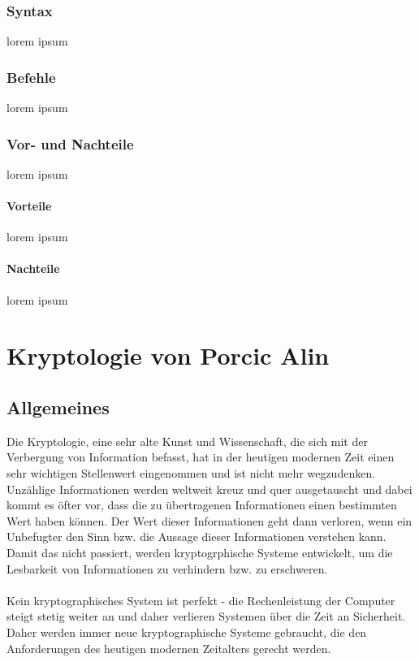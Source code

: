 \documentclass[12pt,a4paper]{report}
\begin{document}
\subsection{Syntax}
lorem ipsum 
\subsection{Befehle}
lorem ipsum
\subsection{Vor- und Nachteile}
lorem ipsum
\subsubsection{Vorteile}
lorem ipsum
\subsubsection{Nachteile}
lorem ipsum

\chapter{Kryptologie von Porcic Alin}
\section{Allgemeines}

Die Kryptologie, eine sehr alte Kunst und Wissenschaft, die sich mit der Verbergung von Information befasst, hat in der heutigen modernen Zeit einen sehr wichtigen Stellenwert eingenommen und ist nicht mehr wegzudenken. Unzählige Informationen werden weltweit kreuz und quer ausgetauscht und dabei kommt es öfter vor, dass die zu übertragenen Informationen einen bestimmten Wert haben können. Der Wert dieser Informationen geht dann verloren, wenn ein Unbefugter den Sinn bzw. die Aussage dieser Informationen verstehen kann. Damit das nicht passiert, werden kryptogrphische Systeme entwickelt, um die Lesbarkeit von Informationen zu verhindern bzw. zu erschweren.\\\\

Kein kryptographisches System ist perfekt - die Rechenleistung der Computer steigt stetig weiter an und daher verlieren Systemen über die Zeit an Sicherheit. Daher werden immer neue kryptographische Systeme gebraucht, die den Anforderungen des heutigen modernen Zeitalters gerecht werden.\\\\
\end{document}
